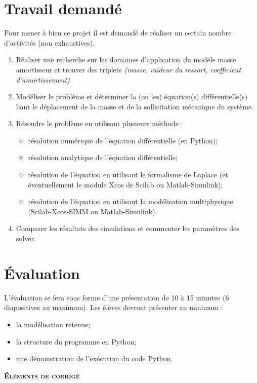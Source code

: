 \documentclass[10pt]{article}
\newif\ifprof
\begin{document}
\section{Travail demandé}
Pour mener à bien ce projet il est demandé de réaliser un certain nombre d'activités (non exhaustives).
\begin{enumerate}
\item Réaliser une recherche sur les domaines d'application du modèle masse amortisseur et trouver des triplets \textit{(masse, raideur du ressort, coefficient d'amortissement)}
\item Modéliser le problème et déterminer la (ou les) équation(s) différentielle(s) liant le déplacement de la masse et de la sollicitation mécanique du système.
\item Résoudre le problème en utilisant plusieurs méthode : 
\begin{itemize}
\item résolution numérique de l'équation différentielle (en Python);
\item résolution analytique de l'équation différentielle;
\item résolution de l'équation en utilisant le formalisme de Laplace (et éventuellement le module Xcos de Scilab ou Matlab-Simulink);
\item résolution de l'équation en utilisant la modélisation multiphysique (Scilab-Xcos-SIMM ou Matlab-Simulink).
\end{itemize}
\item Comparer les résultats des simulations et commenter les paramètres des solver.
\end{enumerate}

\section{Évaluation}
L'évaluation se fera sous forme d'une présentation de 10 à 15 minutes (6 diapositives au maximum). Les élèves devront présenter au minimum : 
\begin{itemize}
\item la modélisation retenue;
\item la structure du programme en Python;
\item une démonstration de l'exécution du code Python.
\end{itemize}

\ifprof
\newpage

\setcounter{section}{0}
\begin{center}
\textsc\textbf{{Éléments de corrigé}}
\end{center}
\end{document}
